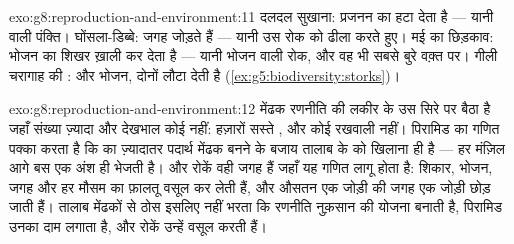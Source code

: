 \begin{solution}{exo:g8:reproduction-and-environment:11}
दलदल सुखाना: प्रजनन का  हटा देता है --- यानी  वाली पंक्ति।
घोंसला-डिब्बे: जगह जोड़ते हैं --- यानी उस रोक को ढीला करते हुए। मई का
छिड़काव: भोजन का शिखर ख़ाली कर देता है --- यानी भोजन वाली रोक, और वह भी
सबसे बुरे वक़्त पर। गीली चरागाह की :  और भोजन, दोनों लौटा देती
है (\cref{ex:g5:biodiversity:storks})।
\end{solution}

\begin{solution}{exo:g8:reproduction-and-environment:12}
मेंढक रणनीति की लकीर के उस सिरे पर बैठा है जहाँ संख्या ज़्यादा और
देखभाल कोई नहीं: हज़ारों सस्ते , और कोई रखवाली नहीं। पिरामिड का गणित
पक्का करता है कि  का ज़्यादातर पदार्थ मेंढक बनने के बजाय तालाब
के  को खिलाना ही है --- हर मंज़िल आगे बस एक अंश ही भेजती है।
और रोकें वही जगह हैं जहाँ यह गणित लागू होता है: शिकार, भोजन, जगह और
 हर मौसम का फ़ालतू वसूल कर लेती हैं, और औसतन एक जोड़ी की जगह
एक जोड़ी छोड़ जाती हैं। तालाब मेंढकों से ठोस इसलिए नहीं भरता कि रणनीति
नुक़सान की योजना बनाती है, पिरामिड उनका दाम लगाता है, और रोकें उन्हें
वसूल करती हैं।
\end{solution}

